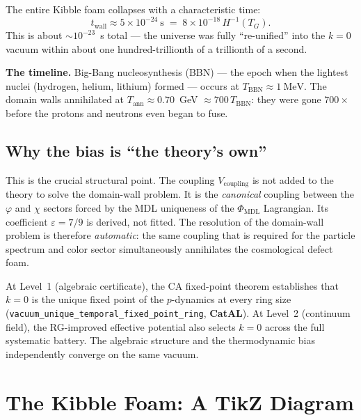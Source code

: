 \documentclass[11pt,a4paper]{article}
\newcommand{\PHIMDL}{\Phi_{\mathrm{MDL}}}
\newcommand{\CatAL}{\textbf{CatAL}}
\begin{document}
The entire Kibble foam collapses with a characteristic time:
\[
  t_\mathrm{wall} \approx 5\times10^{-24}~\text{s}
  \;=\; 8\times10^{-18}\,H^{-1}(T_G).
\]
This is about $\sim 10^{-23}$~s total --- the universe was fully
``re-unified'' into the $k = 0$ vacuum within about one hundred-trillionth
of a trillionth of a second.

\medskip
\noindent
\textbf{The timeline.}
Big-Bang nucleosynthesis (BBN) --- the epoch when the lightest nuclei (hydrogen,
helium, lithium) formed --- occurs at $T_\mathrm{BBN} \approx 1~\text{MeV}$.
The domain walls annihilated at $T_\mathrm{ann} \approx 0.70$~GeV $\approx
700\,T_\mathrm{BBN}$: they were gone $700\times$ before the protons and neutrons
even began to fuse.

\subsection{Why the bias is ``the theory's own''}

This is the crucial structural point.
The coupling $V_\mathrm{coupling}$ is not added to the theory to solve the
domain-wall problem.
It is the \emph{canonical} coupling between the $\varphi$ and $\chi$ sectors
forced by the MDL uniqueness of the $\PHIMDL$ Lagrangian.
Its coefficient $\varepsilon = 7/9$ is derived, not fitted.
The resolution of the domain-wall problem is therefore \emph{automatic}: the
same coupling that is required for the particle spectrum and color sector
simultaneously annihilates the cosmological defect foam.

\begin{tcolorbox}[colback=boxgreen,colframe=green!50!black,
  title={Cross-level consistency remark}]
At Level~1 (algebraic certificate), the CA fixed-point theorem establishes
that $k = 0$ is the unique fixed point of the $p$-dynamics at every ring size
(\texttt{vacuum\_unique\_temporal\_fixed\_point\_ring}, \CatAL{}).
At Level~2 (continuum field), the RG-improved effective potential also selects
$k = 0$ across the full systematic battery.
The algebraic structure and the thermodynamic bias independently converge on
the same vacuum.
\end{tcolorbox}

\section{The Kibble Foam: A TikZ Diagram}
\end{document}
